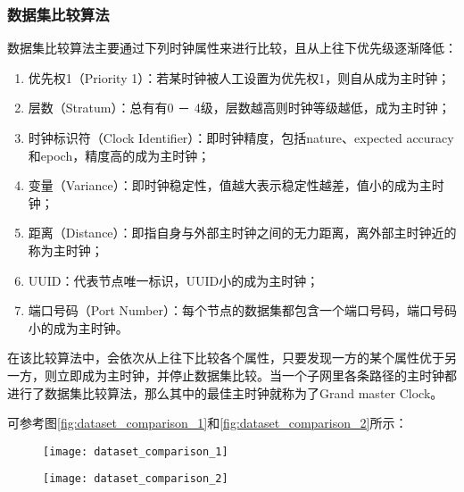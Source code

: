 \subsubsection{数据集比较算法}
数据集比较算法主要通过下列时钟属性来进行比较，且从上往下优先级逐渐降低：
\begin{enumerate}[noitemsep,topsep=0pt,parsep=0pt,partopsep=0pt]
	\item 优先权1（Priority 1）：若某时钟被人工设置为优先权1，则自从成为主时钟；
	\item 层数（Stratum）：总有有0 － 4级，层数越高则时钟等级越低，成为主时钟；
	\item 时钟标识符（Clock Identifier）：即时钟精度，包括nature、expected accuracy和epoch，精度高的成为主时钟；
	\item 变量（Variance）：即时钟稳定性，值越大表示稳定性越差，值小的成为主时钟；
	\item 距离（Distance）：即指自身与外部主时钟之间的无力距离，离外部主时钟近的称为主时钟；
	\item UUID：代表节点唯一标识，UUID小的成为主时钟；
	\item 端口号码（Port Number）：每个节点的数据集都包含一个端口号码，端口号码小的成为主时钟。
\end{enumerate}

在该比较算法中，会依次从上往下比较各个属性，只要发现一方的某个属性优于另一方，则立即成为主时钟，并停止数据集比较。当一个子网里各条路径的主时钟都进行了数据集比较算法，那么其中的最佳主时钟就称为了Grand master Clock。

可参考图\ref{fig:dataset_comparison_1}和\ref{fig:dataset_comparison_2}所示：

\begin{figure}[!hbp]
  \centering
  \begin{minipage}[b]{0.8\textwidth}
    \captionstyle{\centering}
    \centering
    \texttt{[image: dataset\_comparison\_1]}
  \end{minipage}     
\end{figure}

\begin{figure}[!hbp]
  \centering
  \begin{minipage}[b]{0.6\textwidth}
    \captionstyle{\centering}
    \centering
    \texttt{[image: dataset\_comparison\_2]}
  \end{minipage}     
\end{figure}

